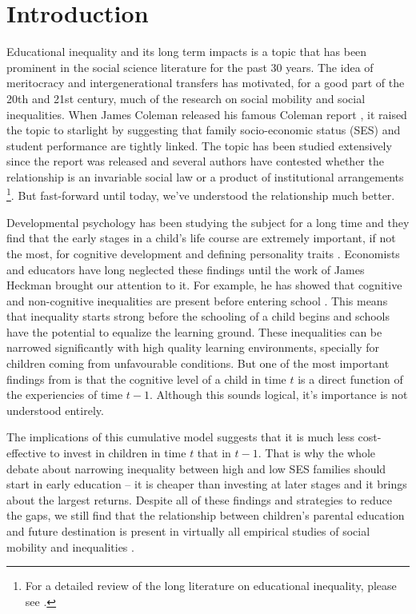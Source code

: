 \documentclass[11pt, a4paper]{article}\usepackage[]{graphicx}\usepackage[]{color}
\begin{document}
\section{Introduction}

Educational inequality and its long term impacts is a topic that has been prominent in the social science literature for the past 30 years. The idea of meritocracy and intergenerational transfers has motivated, for a good part of the 20th and 21st century, much of the research on social mobility and social inequalities. When James Coleman released his famous Coleman report \citep{coleman1966}, it raised the topic to starlight by suggesting that family socio-economic status (SES) and student performance are tightly linked. The topic has been studied extensively since the report was released and several authors have contested whether the relationship is an invariable social law or a product of institutional arrangements \footnote{For a detailed review of the long literature on educational inequality, please see \citet{gamoran2001}.}. But fast-forward until today, we've understood the relationship much better.

Developmental psychology has been studying the subject for a long time and they find that the early stages in a child's life course are extremely important, if not the most, for cognitive development and defining personality traits \citep{duyme1999, waldfogel2006}. Economists and educators have long neglected these findings until the work of James Heckman brought our attention to it. For example, he has showed that cognitive and non-cognitive inequalities are present before entering school \citep{heckman2006}. This means that inequality starts strong before the schooling of a child begins and schools have the potential to equalize the learning ground. These inequalities can be narrowed significantly with high quality learning environments, specially for children coming from unfavourable conditions. But one of the most important findings from \citet{cunha2006} is that the cognitive level of a child in time \(t\) is a direct function of the experiencies of time \(t-1\). Although this sounds logical, it's importance is not understood entirely.

The implications of this cumulative model suggests that it is much less cost-effective to invest in children in time \(t\) that in \(t-1\). That is why the whole debate about narrowing inequality between high and low SES families should start in early education -- it is cheaper than investing at later stages and it brings about the largest returns. Despite all of these findings and strategies to reduce the gaps, we still find that the relationship between children's parental education and future destination is present in virtually all empirical studies of social mobility and inequalities \citep{breen1997, breen2007, waldfogel2006, bradbury2015, chetty2016}.
\end{document}
